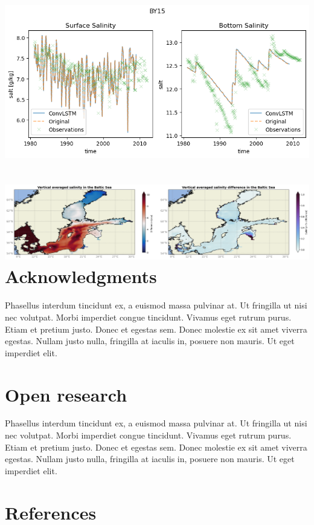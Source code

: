 \documentclass[
]{agujournal2019}
\begin{document}
\includegraphics{images/paste-7.png}

\hypertarget{acknowledgments}{%
\section[Acknowledgments]{\texorpdfstring{\protect\includegraphics{images/paste-8.png}Acknowledgments}{Acknowledgments}}\label{acknowledgments}}

Phasellus interdum tincidunt ex, a euismod massa pulvinar at. Ut
fringilla ut nisi nec volutpat. Morbi imperdiet congue tincidunt.
Vivamus eget rutrum purus. Etiam et pretium justo. Donec et egestas sem.
Donec molestie ex sit amet viverra egestas. Nullam justo nulla,
fringilla at iaculis in, posuere non mauris. Ut eget imperdiet elit.

\hypertarget{open-research}{%
\section{Open research}\label{open-research}}

Phasellus interdum tincidunt ex, a euismod massa pulvinar at. Ut
fringilla ut nisi nec volutpat. Morbi imperdiet congue tincidunt.
Vivamus eget rutrum purus. Etiam et pretium justo. Donec et egestas sem.
Donec molestie ex sit amet viverra egestas. Nullam justo nulla,
fringilla at iaculis in, posuere non mauris. Ut eget imperdiet elit.

\hypertarget{references}{%
\section*{References}\label{references}}
\end{document}
